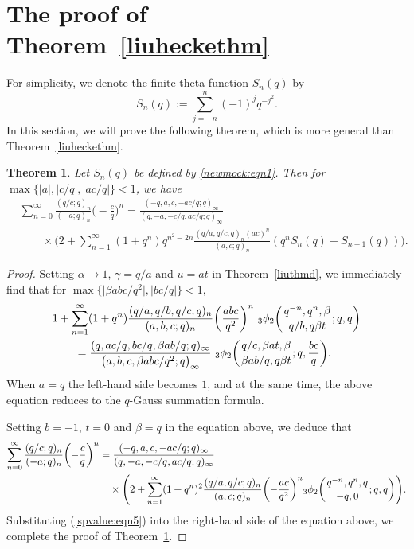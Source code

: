 \documentclass[10pt,a4paper]{amsart}
\numberwithin{equation}{section}
\newtheorem{Theorem}{Theorem}[section]
\begin{document}
\section{The proof of Theorem~\ref{liuheckethm}}\label{sec7}

For simplicity, we denote the finite theta function $S_n(q)$ by
\begin{equation}\label{newmock:eqn1}
S_n(q):=\sum_{j=-n}^n (-1)^j q^{-j^2}.
\end{equation}
In this section, we will prove the following theorem, which is more general than Theorem~\ref{liuheckethm}.
\begin{Theorem} \label{andmockthm}
Let $S_n(q)$ be defined by \eqref{newmock:eqn1}. Then for $\max \{|a|, |c/q|, |ac/q|\}<1 $, we have
\begin{align*}%
&\sum_{n=0}^\infty \frac{(q/c; q)_n}{(-a; q)_n} \biggl(-\frac{c}{q}\biggr)^n
=\frac{(-q, a, c, -ac/q; q)_\infty}{(q, -a, -c/q, ac/q; q)_\infty}\\
	&\qquad{} \times \Biggl(2+\sum_{n=1}^\infty (1+q^n)q^{n^2-2n}\frac{(q/a, q/c; q)_n (ac)^n}{(a, c; q)_n}(q^n S_n(q)-S_{n-1}(q)) \Biggr).\nonumber
\end{align*}
\end{Theorem}
\begin{proof}
	Setting $\alpha \to 1$, $\gamma=q/a$ and $u=at$ in Theorem~\ref{liuthmd}, we immediately find that for $\max\bigl\{\bigl|\beta abc/q^2\bigr|, \bigl|bc/q\bigr|\bigr\}<1,$
	\begin{align}
		&1+\sum_{n=1}^\infty (1+q^n) \frac{(q/a, q/b, q/c; q)_n}{(a, b, c; q)_n} \biggl(\frac{abc}{q^2}\biggr)^n~{_3\phi_2}\biggl({{q^{-n}, q^n, \beta}\atop{q/b, q\beta t}}; q, q\biggr)\nonumber\\
		&\qquad{}=\frac{(q, ac/q, bc/q, \beta ab/q; q)_\infty}{\bigl(a, b, c, \beta abc/q^2; q\bigr)_\infty}~
		{_3\phi_2}\biggl({{q/c, \beta at, \beta}\atop{\beta ab/q, q\beta t}}; q, \frac{bc}{q}\biggr).\label{newmock:eqn3}
	\end{align}	
 When $a=q$ the left-hand side becomes $1$, and at the same time, the above equation reduces to the $q$-Gauss summation formula.

	Setting $b=-1$, $t=0$ and $\beta=q$ in the equation above, we deduce that
	\begin{align*}%
\sum_{n=0}^\infty \frac{(q/c; q)_n}{(-a; q)_n} \biggl(-\frac{c}{q}\biggr)^n
		&{}=\frac{(-q, a, c, -ac/q; q)_\infty}{(q, -a, -c/q, ac/q; q)_\infty}\\
		&\quad{} \times \Biggl(2+\sum_{n=1}^\infty (1+q^n)^2 \frac{(q/a, q/c; q)_n}{(a, c; q)_n}
		\biggl(-\frac{ac}{q^2}\biggr)^n {_3\phi_2}\biggl({{q^{-n}, q^n, q}\atop{-q, 0}}; q, q\biggr)\Biggr).\nonumber
	\end{align*}	
	 Substituting (\ref{spvalue:eqn5}) into the right-hand side of the equation above, we complete the proof of Theorem~\ref{andmockthm}.
\end{proof}
\end{document}
